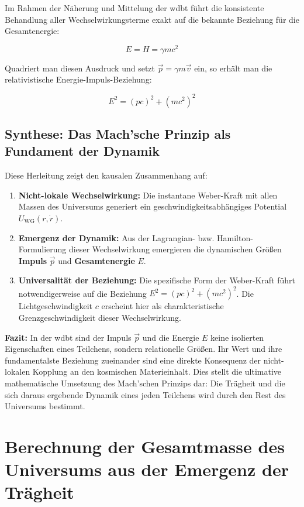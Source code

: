 Im Rahmen der Näherung und Mittelung der \gls{wdbt} führt die konsistente Behandlung aller Wechselwirkungsterme exakt auf die bekannte Beziehung für die Gesamtenergie:

\begin{equation}
    E = H = \gamma m c^2
\end{equation}

Quadriert man diesen Ausdruck und setzt $\vec{p} = \gamma m \vec{v}$ ein, so erhält man die relativistische Energie-Impuls-Beziehung:

\begin{equation}
    E^2 = (p c)^2 + (m c^2)^2
\end{equation}

\section{Synthese: Das Mach'sche Prinzip als Fundament der Dynamik}
Diese Herleitung zeigt den kausalen Zusammenhang auf:

\begin{enumerate}
    \item \textbf{Nicht-lokale Wechselwirkung:} Die instantane Weber-Kraft mit allen Massen des Universums generiert ein geschwindigkeitsabhängiges Potential $U_\text{WG}(r, \dot{r})$.
    \item \textbf{Emergenz der Dynamik:} Aus der Lagrangian- bzw. Hamilton-Formulierung dieser Wechselwirkung emergieren die dynamischen Größen \textbf{Impuls} $\vec{p}$ und \textbf{Gesamtenergie} $E$.
    \item \textbf{Universalität der Beziehung:} Die spezifische Form der Weber-Kraft führt notwendigerweise auf die Beziehung $E^2 = (p c)^2 + (m c^2)^2$. Die Lichtgeschwindigkeit $c$ erscheint hier als charakteristische Grenzgeschwindigkeit dieser Wechselwirkung.
\end{enumerate}

\textbf{Fazit:} In der \gls{wdbt} sind der Impuls $\vec{p}$ und die Energie $E$ keine isolierten Eigenschaften eines Teilchens, sondern relationelle Größen. Ihr Wert und ihre fundamentalste Beziehung
zueinander sind eine direkte Konsequenz der nicht-lokalen Kopplung an den kosmischen Materieinhalt. Dies stellt die ultimative mathematische Umsetzung des Mach'schen Prinzips dar: Die Trägheit und die
sich daraus ergebende Dynamik eines jeden Teilchens wird durch den Rest des Universums bestimmt.

\chapter{Berechnung der Gesamtmasse des Universums aus der Emergenz der Trägheit}
